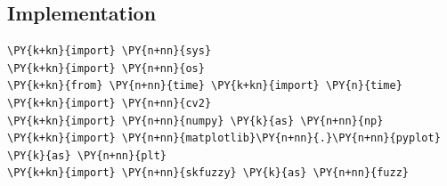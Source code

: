 \subsection{Implementation}

\begin{tcolorbox}[breakable, size=fbox, boxrule=1pt, pad at break*=1mm,colback=cellbackground, colframe=cellborder]
	\begin{Verbatim}[commandchars=\\\{\}]
\PY{k+kn}{import} \PY{n+nn}{sys}
\PY{k+kn}{import} \PY{n+nn}{os}
\PY{k+kn}{from} \PY{n+nn}{time} \PY{k+kn}{import} \PY{n}{time}
\PY{k+kn}{import} \PY{n+nn}{cv2}
\PY{k+kn}{import} \PY{n+nn}{numpy} \PY{k}{as} \PY{n+nn}{np}
\PY{k+kn}{import} \PY{n+nn}{matplotlib}\PY{n+nn}{.}\PY{n+nn}{pyplot} \PY{k}{as} \PY{n+nn}{plt}
\PY{k+kn}{import} \PY{n+nn}{skfuzzy} \PY{k}{as} \PY{n+nn}{fuzz}
	\end{Verbatim}
\end{tcolorbox}

